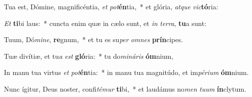 \item Tua est, Dómine, magnificéntia, \textit{et} \textit{pot}\textbf{én}tia,~* et glória, \textit{at}\textit{que} \textit{vic}\textbf{tó}ria:
\item \textit{Et} \textbf{ti}bi laus:~* cuncta enim quæ in cælo sunt, et \textit{in} \textit{ter}\textit{ra}, \textbf{tu}a sunt:
\item Tuum, Dó\textit{mi}\textit{ne}, \textbf{re}gnum,~* et tu es su\textit{per} \textit{om}\textit{nes} \textbf{prín}cipes.
\item Tuæ divítiæ, et tu\textit{a} \textit{est} \textbf{gló}ria:~* tu do\textit{mi}\textit{ná}\textit{ris} \textbf{óm}nium,
\item In manu tua virtus \textit{et} \textit{pot}\textbf{én}tia:~* in manu tua magnitúdo, et im\textit{pé}\textit{ri}\textit{um} \textbf{óm}nium.
\item Nunc ígitur, Deus noster, confi\textit{té}\textit{mur} \textbf{ti}bi,~* et laudámus no\textit{men} \textit{tu}\textit{um} \textbf{ín}clytum.
